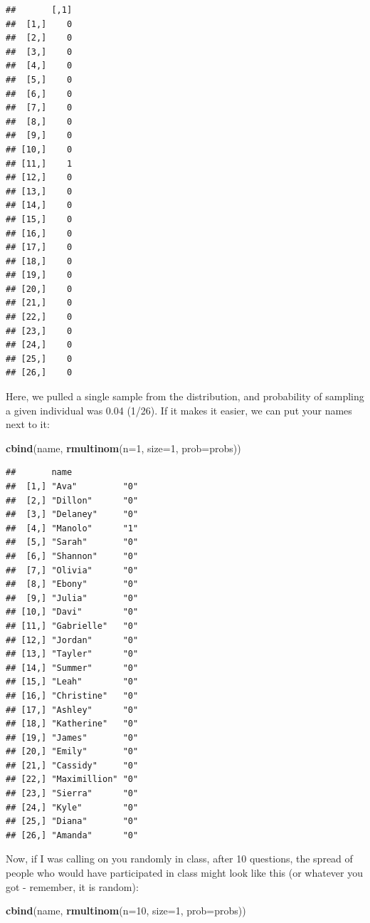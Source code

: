 \documentclass[
]{book}
\newenvironment{Shaded}{\begin{snugshade}}{\end{snugshade}}
\newcommand{\DataTypeTok}[1]{\textcolor[rgb]{0.13,0.29,0.53}{#1}}
\newcommand{\DecValTok}[1]{\textcolor[rgb]{0.00,0.00,0.81}{#1}}
\newcommand{\KeywordTok}[1]{\textcolor[rgb]{0.13,0.29,0.53}{\textbf{#1}}}
\newcommand{\NormalTok}[1]{#1}
\begin{document}
\begin{verbatim}
##       [,1]
##  [1,]    0
##  [2,]    0
##  [3,]    0
##  [4,]    0
##  [5,]    0
##  [6,]    0
##  [7,]    0
##  [8,]    0
##  [9,]    0
## [10,]    0
## [11,]    1
## [12,]    0
## [13,]    0
## [14,]    0
## [15,]    0
## [16,]    0
## [17,]    0
## [18,]    0
## [19,]    0
## [20,]    0
## [21,]    0
## [22,]    0
## [23,]    0
## [24,]    0
## [25,]    0
## [26,]    0
\end{verbatim}

Here, we pulled a single sample from the distribution, and probability of sampling a given individual was 0.04 (1/26). If it makes it easier, we can put your names next to it:

\begin{Shaded}
\begin{Highlighting}[]
\KeywordTok{cbind}\NormalTok{(name, }\KeywordTok{rmultinom}\NormalTok{(}\DataTypeTok{n=}\DecValTok{1}\NormalTok{, }\DataTypeTok{size=}\DecValTok{1}\NormalTok{, }\DataTypeTok{prob=}\NormalTok{probs))}
\end{Highlighting}
\end{Shaded}

\begin{verbatim}
##       name             
##  [1,] "Ava"         "0"
##  [2,] "Dillon"      "0"
##  [3,] "Delaney"     "0"
##  [4,] "Manolo"      "1"
##  [5,] "Sarah"       "0"
##  [6,] "Shannon"     "0"
##  [7,] "Olivia"      "0"
##  [8,] "Ebony"       "0"
##  [9,] "Julia"       "0"
## [10,] "Davi"        "0"
## [11,] "Gabrielle"   "0"
## [12,] "Jordan"      "0"
## [13,] "Tayler"      "0"
## [14,] "Summer"      "0"
## [15,] "Leah"        "0"
## [16,] "Christine"   "0"
## [17,] "Ashley"      "0"
## [18,] "Katherine"   "0"
## [19,] "James"       "0"
## [20,] "Emily"       "0"
## [21,] "Cassidy"     "0"
## [22,] "Maximillion" "0"
## [23,] "Sierra"      "0"
## [24,] "Kyle"        "0"
## [25,] "Diana"       "0"
## [26,] "Amanda"      "0"
\end{verbatim}

Now, if I was calling on you randomly in class, after 10 questions, the spread of people who would have participated in class might look like this (or whatever you got - remember, it is random):

\begin{Shaded}
\begin{Highlighting}[]
\KeywordTok{cbind}\NormalTok{(name, }\KeywordTok{rmultinom}\NormalTok{(}\DataTypeTok{n=}\DecValTok{10}\NormalTok{, }\DataTypeTok{size=}\DecValTok{1}\NormalTok{, }\DataTypeTok{prob=}\NormalTok{probs))}
\end{Highlighting}
\end{Shaded}
\end{document}

